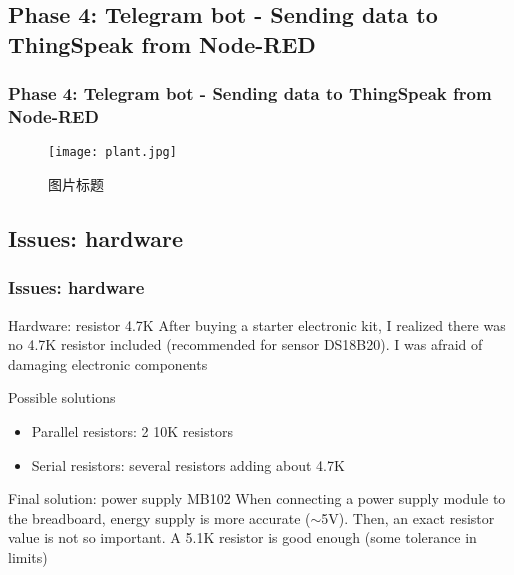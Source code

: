 \documentclass[
    aspectratio=169,                   %
]{beamer}
\begin{document}
\subsection{Phase 4: Telegram bot - Sending data to ThingSpeak from Node-RED}

    \begin{frame}
        \frametitle{Phase 4: Telegram bot - Sending data to ThingSpeak from Node-RED}
        \begin{figure}
            \centering
            \begin{stampbox}
                \texttt{[image: plant.jpg]}
            \end{stampbox}
            \caption{图片标题}
        \end{figure}
    \end{frame}

\subsection{Issues: hardware}

    \begin{frame}
        \frametitle{Issues: hardware}

        \begin{block}{Hardware: resistor 4.7K}
            After buying a starter electronic kit, I realized there was no 4.7K resistor included (recommended\cite{resistor} for sensor DS18B20). I was afraid of damaging electronic components
        \end{block}

        \begin{block}{Possible solutions}
            \begin{itemize}
                \item \alert{Parallel resistors}: 2 10K resistors
                \item \alert{Serial resistors}: several resistors adding about 4.7K
            \end{itemize}
        \end{block}

        \begin{block}{Final solution: power supply MB102}
            When connecting a power supply module to the breadboard, energy supply is more accurate ($\sim$5V). Then, an exact resistor value is not so important. A 5.1K resistor is good enough (some tolerance in limits)
        \end{block}

    \end{frame}
\end{document}
